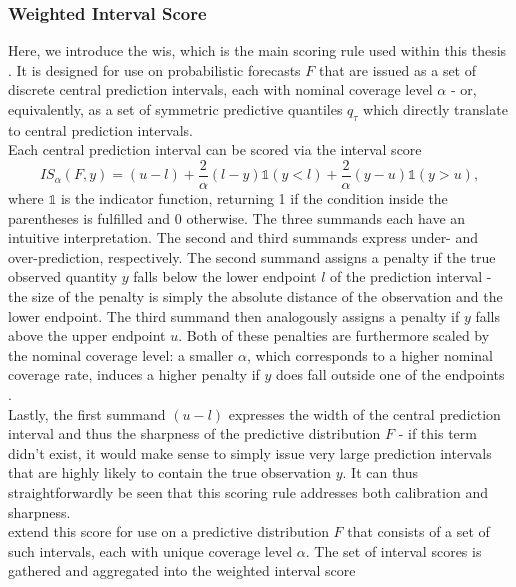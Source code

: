 \subsubsection{Weighted Interval Score} \label{ssub:weighted_interval_score}
Here, we introduce the \ac{wis}, which is the main scoring rule used within this thesis \citep{bracher_evaluating_2021}. It is designed for use on probabilistic forecasts  $F$ that are issued as a set of discrete central prediction intervals, each with nominal coverage level $\alpha$ - or, equivalently, as a set of symmetric predictive quantiles $q_\tau$ which directly translate to central prediction intervals. \\
Each central prediction interval can be scored via the interval score \citep{gneiting_strictly_2007}
\begin{equation} \label{eq:interval_score}
IS_{\alpha}(F, y) = (u-l) + \frac{2}{\alpha}(l - y)\mathbb{1}(y < l) + \frac{2}{\alpha}(y - u)\mathbb{1}(y > u),
\end{equation}
where $\mathbb{1}$ is the indicator function, returning 1 if the condition inside the parentheses is fulfilled and 0 otherwise. The three summands each have an intuitive interpretation. The second and third summands express under- and over-prediction, respectively. The second summand assigns a penalty if the true observed quantity $y$ falls below  the lower endpoint $l$ of the prediction interval - the size of the penalty is simply the absolute distance of the observation and the lower endpoint. The third summand then analogously assigns a penalty if $y$ falls above the upper endpoint $u$. Both of these penalties are furthermore scaled by the nominal coverage level: a smaller $\alpha$, which corresponds to a higher nominal coverage rate, induces a higher penalty if $y$ does fall outside one of the endpoints \citep{bracher_evaluating_2021}. \\ 
Lastly, the first summand $(u-l)$ expresses the width of the central prediction interval and thus the sharpness of the predictive distribution $F$ - if this term didn't exist, it would make sense to simply issue very large prediction intervals that are highly likely to contain the true observation $y$. It can thus straightforwardly be seen that this scoring rule addresses both calibration and sharpness.\\
\cite{bracher_evaluating_2021} extend this score for use on a predictive distribution $F$ that consists of a set of such intervals, each with unique coverage level $\alpha$. The set of interval scores is gathered and aggregated into the weighted interval score 
